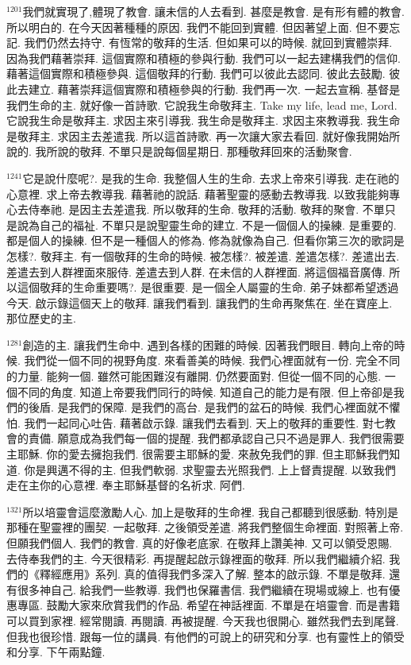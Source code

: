 \documentclass{book}
\begin{document}
$^{1201}$我們就實現了,體現了教會.
讓未信的人去看到.
甚麼是教會.
是有形有體的教會.
所以明白的.
在今天因著種種的原因.
我們不能回到實體.
但因著望上面.
但不要忘記.
我們仍然去持守.
有恆常的敬拜的生活.
但如果可以的時候.
就回到實體崇拜.
因為我們藉著崇拜.
這個實際和積極的參與行動.
我們可以一起去建構我們的信仰.
藉著這個實際和積極參與.
這個敬拜的行動.
我們可以彼此去認同.
彼此去鼓勵.
彼此去建立.
藉著崇拜這個實際和積極參與的行動.
我們再一次.
一起去宣稱.
基督是我們生命的主.
就好像一首詩歌.
它說我生命敬拜主.
Take my life, lead me, Lord.
它說我生命是敬拜主.
求因主來引導我.
我生命是敬拜主.
求因主來教導我.
我生命是敬拜主.
求因主去差遣我.
所以這首詩歌.
再一次讓大家去看回.
就好像我開始所說的.
我所說的敬拜.
不單只是說每個星期日.
那種敬拜回來的活動聚會.

$^{1241}$它是說什麼呢?.
是我的生命.
我整個人生的生命.
去求上帝來引導我.
走在祂的心意裡.
求上帝去教導我.
藉著祂的說話.
藉著聖靈的感動去教導我.
以致我能夠專心去侍奉祂.
是因主去差遣我.
所以敬拜的生命.
敬拜的活動.
敬拜的聚會.
不單只是說為自己的福祉.
不單只是說聖靈生命的建立.
不是一個個人的操練.
是重要的.
都是個人的操練.
但不是一種個人的修為.
修為就像為自己.
但看你第三次的歌詞是怎樣?.
敬拜主.
有一個敬拜的生命的時候.
被怎樣?.
被差遣.
差遣怎樣?.
差遣出去.
差遣去到人群裡面來服侍.
差遣去到人群.
在未信的人群裡面.
將這個福音廣傳.
所以這個敬拜的生命重要嗎?.
是很重要.
是一個全人屬靈的生命.
弟子妹都希望透過今天.
啟示錄這個天上的敬拜.
讓我們看到.
讓我們的生命再聚焦在.
坐在寶座上.
那位歷史的主.

$^{1281}$創造的主.
讓我們生命中.
遇到各樣的困難的時候.
因著我們眼目.
轉向上帝的時候.
我們從一個不同的視野角度.
來看善美的時候.
我們心裡面就有一份.
完全不同的力量.
能夠一個.
雖然可能困難沒有離開.
仍然要面對.
但從一個不同的心態.
一個不同的角度.
知道上帝要我們同行的時候.
知道自己的能力是有限.
但上帝卻是我們的後盾.
是我們的保障.
是我們的高台.
是我們的盆石的時候.
我們心裡面就不懼怕.
我們一起同心吐告.
藉著啟示錄.
讓我們去看到.
天上的敬拜的重要性.
對七教會的責備.
願意成為我們每一個的提醒.
我們都承認自己只不過是罪人.
我們很需要主耶穌.
你的愛去擁抱我們.
很需要主耶穌的愛.
來赦免我們的罪.
但主耶穌我們知道.
你是興邁不得的主.
但我們軟弱.
求聖靈去光照我們.
上上督責提醒.
以致我們走在主你的心意裡.
奉主耶穌基督的名祈求.
阿們.

$^{1321}$所以培靈會這麼激勵人心.
加上是敬拜的生命裡.
我自己都聽到很感動.
特別是那種在聖靈裡的團契.
一起敬拜.
之後領受差遣.
將我們整個生命裡面.
對照著上帝.
但願我們個人.
我們的教會.
真的好像老底家.
在敬拜上讚美神.
又可以領受恩賜.
去侍奉我們的主.
今天很精彩.
再提醒起啟示錄裡面的敬拜.
所以我們繼續介紹.
我們的《釋經應用》系列.
真的值得我們多深入了解.
整本的啟示錄.
不單是敬拜.
還有很多神自己.
給我們一些教導.
我們也保羅書信.
我們繼續在現場或線上.
也有優惠專區.
鼓勵大家來欣賞我們的作品.
希望在神話裡面.
不單是在培靈會.
而是書籍可以買到家裡.
經常閱讀.
再閱讀.
再被提醒.
今天我也很開心.
雖然我們去到尾聲.
但我也很珍惜.
跟每一位的講員.
有他們的可說上的研究和分享.
也有靈性上的領受和分享.
下午兩點鐘.
\end{document}
